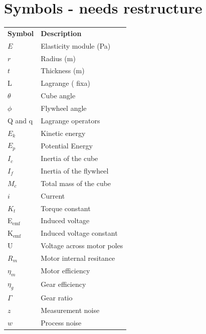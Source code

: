 \documentclass[a4paper,11pt]{kth-mag}
\newcommand{\textunderscript}[1]{$_{\text{#1}}$}
\begin{document}
\section*{Symbols - needs restructure}
\noindent{}\begin{tabular}{@{}p{2.5cm}l}
\textbf{Symbol} 	& \textbf{Description} \vspace{.5em} \\
$E$ 		& Elasticity module (Pa) \\
$r$		& Radius (m) \\
$t$		& Thickness (m) \\
L			& Lagrange ( fixa) \\
$\theta$		& Cube angle\\
$\phi$		& Flywheel angle \\
Q and q		& Lagrange operators \\
$E_k	$		& Kinetic energy \\
$E_p$		& Potential Energy \\
$I_c$		& Inertia of the cube\\
$I_f$		& Inertia of the flywheel\\
$M_c$		& Total mass of the cube\\
$i$			& Current\\
$K_t$		& Torque constant\\
E\textunderscript{emf} 	& Induced voltage \\
K\textunderscript{emf} 	& Induced voltage constant \\
U			& Voltage across motor poles\\
$R_m	$		& Motor internal resitance \\
$\eta_m$		& Motor efficiency\\	
$\eta_g$		& Gear efficiency \\
$\Gamma$		& Gear ratio\\
$z$			& Measurement noise \\
$w$			& Process noise \\

\end{tabular}
\clearpage
\end{document}
